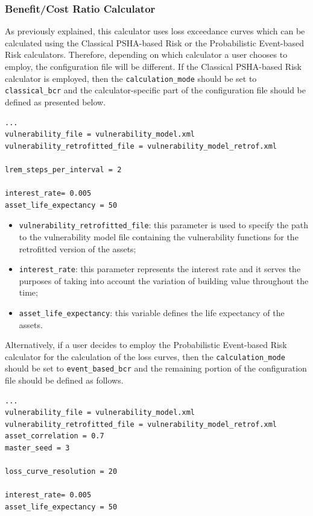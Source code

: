 \subsubsection{Benefit/Cost Ratio Calculator}
As previously explained, this calculator uses loss exceedance curves which can be calculated using the Classical PSHA-based Risk or the Probabilistic Event-based Risk calculators. Therefore, depending on which calculator a user chooses to employ, the configuration file will be different. If the Classical PSHA-based Risk calculator is employed, then the \Verb+calculation_mode+ should be set to \Verb+classical_bcr+ and the calculator-specific part of the configuration file should be defined as presented below.

\begin{Verbatim}[frame=single, commandchars=\\\{\}, samepage=true]
...
vulnerability_file = vulnerability_model.xml
vulnerability_retrofitted_file = vulnerability_model_retrof.xml

lrem_steps_per_interval = 2

interest_rate= 0.005
asset_life_expectancy = 50
\end{Verbatim}

\begin{itemize}
\item  \Verb+vulnerability_retrofitted_file+: this parameter is used to specify the path to the vulnerability model file containing the vulnerability functions for the retrofitted version of the assets;  
\item  \Verb+interest_rate+: this parameter represents the interest rate and it serves the purposes of taking into account the variation of building value throughout the time;
\item  \Verb+asset_life_expectancy+: this variable defines the life expectancy of the assets.
\end{itemize}

Alternatively, if a user decides to employ the Probabilistic Event-based Risk calculator for the calculation of the loss curves, then the \Verb+calculation_mode+ should be set to \Verb+event_based_bcr+ and the remaining portion of the configuration file should be defined as follows.

\begin{Verbatim}[frame=single, commandchars=\\\{\}, samepage=true]
...
vulnerability_file = vulnerability_model.xml
vulnerability_retrofitted_file = vulnerability_model_retrof.xml
asset_correlation = 0.7
master_seed = 3

loss_curve_resolution = 20

interest_rate= 0.005
asset_life_expectancy = 50
\end{Verbatim}